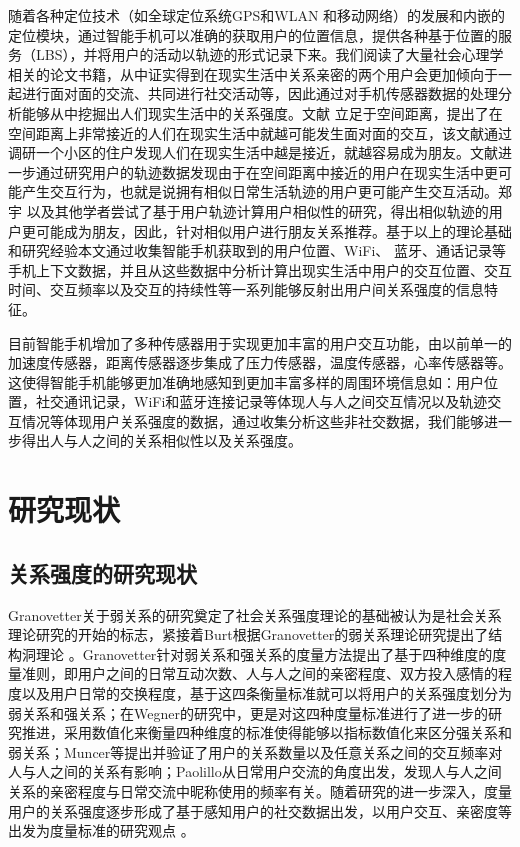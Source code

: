 \par 随着各种定位技术（如全球定位系统GPS和WLAN 和移动网络）的发展和内嵌的定位模块，通过智能手机可以准确的获取用户的位置信息，提供各种基于位置的服务（LBS），并将用户的活动以轨迹的形式记录下来。我们阅读了大量社会心理学相关的论文书籍，从中证实得到在现实生活中关系亲密的两个用户会更加倾向于一起进行面对面的交流、共同进行社交活动等，因此通过对手机传感器数据的处理分析能够从中挖掘出人们现实生活中的关系强度。文献\cite{zillmann2013selective} 立足于空间距离，提出了在空间距离上非常接近的人们在现实生活中就越可能发生面对面的交互，该文献通过调研一个小区的住户发现人们在现实生活中越是接近，就越容易成为朋友。文献\cite{zajonc1968attitudinal,zillmann2000mood}进一步通过研究用户的轨迹数据发现由于在空间距离中接近的用户在现实生活中更可能产生交互行为，也就是说拥有相似日常生活轨迹的用户更可能产生交互活动。郑宇 以及其他学者尝试了基于用户轨迹计算用户相似性的研究，得出相似轨迹的用户更可能成为朋友，因此，针对相似用户进行朋友关系推荐。基于以上的理论基础和研究经验本文通过收集智能手机获取到的用户位置、WiFi、 蓝牙、通话记录等手机上下文数据，并且从这些数据中分析计算出现实生活中用户的交互位置、交互时间、交互频率以及交互的持续性等一系列能够反射出用户间关系强度的信息特征。

\par 目前智能手机增加了多种传感器用于实现更加丰富的用户交互功能，由以前单一的加速度传感器，距离传感器逐步集成了压力传感器，温度传感器，心率传感器等。这使得智能手机能够更加准确地感知到更加丰富多样的周围环境信息如：用户位置，社交通讯记录，WiFi和蓝牙连接记录等体现人与人之间交互情况以及轨迹交互情况等体现用户关系强度的数据，通过收集分析这些非社交数据，我们能够进一步得出人与人之间的关系相似性以及关系强度。


\section{研究现状}
\subsection{关系强度的研究现状}
Granovetter关于弱关系的研究奠定了社会关系强度理论的基础被认为是社会关系理论研究的开始的标志，紧接着Burt根据Granovetter的弱关系理论研究提出了结构洞理论
。Granovetter针对弱关系和强关系的度量方法提出了基于四种维度的度量准则，即用户之间的日常互动次数、人与人之间的亲密程度、双方投入感情的程度以及用户日常的交换程度，基于这四条衡量标准就可以将用户的关系强度划分为弱关系和强关系；在Wegner的研究中，更是对这四种度量标准进行了进一步的研究推进，采用数值化来衡量四种维度的标准使得能够以指标数值化来区分强关系和弱关系；Muncer等提出并验证了用户的关系数量以及任意关系之间的交互频率对人与人之间的关系有影响；Paolillo从日常用户交流的角度出发，发现人与人之间关系的亲密程度与日常交流中昵称使用的频率有关。随着研究的进一步深入，度量用户的关系强度逐步形成了基于感知用户的社交数据出发，以用户交互、亲密度等出发为度量标准的研究观点
。
